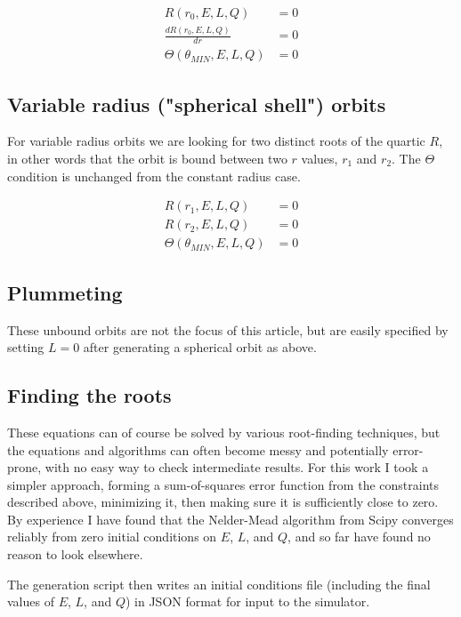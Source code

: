 \documentclass[11pt]{article}
\begin{document}
\begin{align}
R(r_0, E, L, Q) &= 0 \\
\frac{d R(r_0, E, L, Q)}{d r} &= 0 \\
\Theta(\theta_{MIN}, E, L, Q) &= 0
\end{align}

\subsection{Variable radius ("spherical shell") orbits}

For variable radius orbits we are looking for two distinct roots of the quartic $R$, in other words that the orbit is bound between two $r$ values, $r_1$ and $r_2$.  The $\Theta$ condition is unchanged from the constant radius case.

\begin{align}
R(r_1, E, L, Q) &= 0 \\
R(r_2, E, L, Q) &= 0 \\
\Theta(\theta_{MIN}, E, L, Q) &= 0
\end{align}

\subsection{Plummeting}

These unbound orbits are not the focus of this article, but are easily specified by setting $L = 0$ after generating a spherical orbit as above.

\subsection{Finding the roots}

These equations can of course be solved by various root-finding techniques, but the equations and algorithms can often become messy and potentially error-prone, with no easy way to check intermediate results.  For this work I took a simpler approach, forming a sum-of-squares error function from the constraints described above, minimizing it, then making sure it is sufficiently close to zero.  By experience I have found that the Nelder-Mead algorithm from Scipy converges reliably from zero initial conditions on $E$, $L$, and $Q$, and so far have found no reason to look elsewhere.

The generation script then writes an initial conditions file (including the final values of $E$, $L$, and $Q$) in JSON format for input to the simulator.
\end{document}
